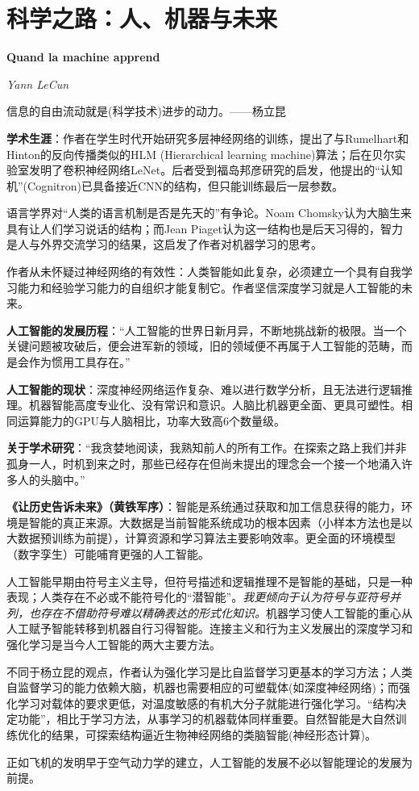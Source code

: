 \chapter{科学之路：人、机器与未来}
\Large\textbf{Quand la machine apprend}
\par \emph{Yann LeCun} \normalsize

\par 信息的自由流动就是(科学技术)进步的动力。——杨立昆

\par \textbf{学术生涯}：作者在学生时代开始研究多层神经网络的训练，提出了与Rumelhart和Hinton的反向传播类似的HLM (Hierarchical learning machine)算法；后在贝尔实验室发明了卷积神经网络LeNet。后者受到福岛邦彦研究的启发，他提出的“认知机”(Cognitron)已具备接近CNN的结构，但只能训练最后一层参数。
\par 语言学界对“人类的语言机制是否是先天的”有争论。Noam Chomsky认为大脑生来具有让人们学习说话的结构；而Jean Piaget认为这一结构也是后天习得的，智力是人与外界交流学习的结果，这启发了作者对机器学习的思考。
\par 作者从未怀疑过神经网络的有效性：人类智能如此复杂，必须建立一个具有自我学习能力和经验学习能力的自组织才能复制它。作者坚信深度学习就是人工智能的未来。

\par \textbf{人工智能的发展历程}：“人工智能的世界日新月异，不断地挑战新的极限。当一个关键问题被攻破后，便会进军新的领域，旧的领域便不再属于人工智能的范畴，而是会作为惯用工具存在。”

\par \textbf{人工智能的现状}：深度神经网络运作复杂、难以进行数学分析，且无法进行逻辑推理。机器智能高度专业化、没有常识和意识。人脑比机器更全面、更具可塑性。相同运算能力的GPU与人脑相比，功率大致高6个数量级。

\par \textbf{关于学术研究}：“我贪婪地阅读，我熟知前人的所有工作。在探索之路上我们并非孤身一人，时机到来之时，那些已经存在但尚未提出的理念会一个接一个地涌入许多人的头脑中。”

\par \textbf{《让历史告诉未来》（黄铁军序）}：智能是系统通过获取和加工信息获得的能力，环境是智能的真正来源。大数据是当前智能系统成功的根本因素（小样本方法也是以大数据预训练为前提），计算资源和学习算法主要影响效率。更全面的环境模型（数字孪生）可能哺育更强的人工智能。
\par 人工智能早期由符号主义主导，但符号描述和逻辑推理不是智能的基础，只是一种表现；人类存在不必或不能符号化的“潜智能”。\emph{我更倾向于认为符号与亚符号并列，也存在不借助符号难以精确表达的形式化知识。}机器学习使人工智能的重心从人工赋予智能转移到机器自行习得智能。连接主义和行为主义发展出的深度学习和强化学习是当今人工智能的两大主要方法。
\par 不同于杨立昆的观点，作者认为强化学习是比自监督学习更基本的学习方法；人类自监督学习的能力依赖大脑，机器也需要相应的可塑载体(如深度神经网络)；而强化学习对载体的要求更低，对温度敏感的有机大分子就能进行强化学习。“结构决定功能”，相比于学习方法，从事学习的机器载体同样重要。自然智能是大自然训练优化的结果，可探索结构逼近生物神经网络的类脑智能(神经形态计算)。
\par 正如飞机的发明早于空气动力学的建立，人工智能的发展不必以智能理论的发展为前提。